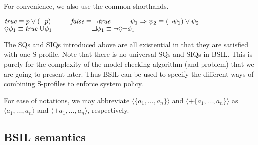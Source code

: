 \documentclass[11pt]{article}
\newcommand{\true}{\mbox{\em true}}
\newcommand{\false}{\mbox{\em false}}
\newcommand{\pfrr}{\Box}
\newcommand{\until}{\textrm{U}} %
\newcommand{\pevt}{\Diamond}
\begin{document}
For convenience, we also use the common shorthands.
\begin{center}
\label{reply2.conj.redundancy} 
$
\true
\equiv p\vee(\neg p) 
\hspace*{10mm} 
\false
\equiv \neg\true 
\hspace*{10mm} 
\psi_1\Rightarrow \psi_2
\equiv (\neg \psi_1)\vee \psi_2$ \\
$\pevt \phi_1
\equiv \true\;\until \phi_1 
\hspace*{20mm} 
\pfrr \phi_1
\equiv \neg\pevt\neg\phi_1 
$
\end{center} 
The SQs and SIQs introduced above are 
all existential in that they are satisfied with one S-profile.  
Note that there is no universal SQs and SIQs in BSIL.  
This is purely for the complexity of the model-checking algorithm (and problem)
that we are going to present later.  
Thus BSIL can be used to specify the different ways of combining S-profiles 
to enforce system policy.  

For ease of notations, 
we may abbreviate 
$\langle \{a_1,\ldots,a_n\}\rangle$ and  
$\langle+ \{a_1,\ldots,a_n\}\rangle$ as 
$\langle a_1,\ldots,a_n\rangle$ and  
$\langle+a_1,\ldots,a_n\rangle$, respectively.




\subsection{BSIL semantics 
\label{subsec.bsil.semantics}}
\end{document}
